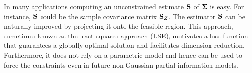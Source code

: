 \documentclass[11pt]{article}
\newcommand{\COR}{\text{COR}}
\theoremstyle{definition}
\theoremstyle{definition}
\def\bSigma{{\bf \Sigma}}
\def\M{{\bf M}}
\def\SS{{\bf S}}
\def\Tr{\text{tr}}
\begin{document}
In many applications computing an unconstrained estimate $\SS$ of $\bSigma$ is easy. For instance, $\SS$ could be the sample covariance matrix  $\SS_Z$. The estimator $\SS$ can be naturally improved by projecting it onto the feasible region. This approach, sometimes known as the least squares approach (LSE), 
motivates a loss function that guarantees a globally optimal solution and facilitates dimension reduction. Furthermore, it does not rely on a parametric model and hence can be used to force the constraints even in future non-Gaussian partial information models. 
%
%
\end{document}
